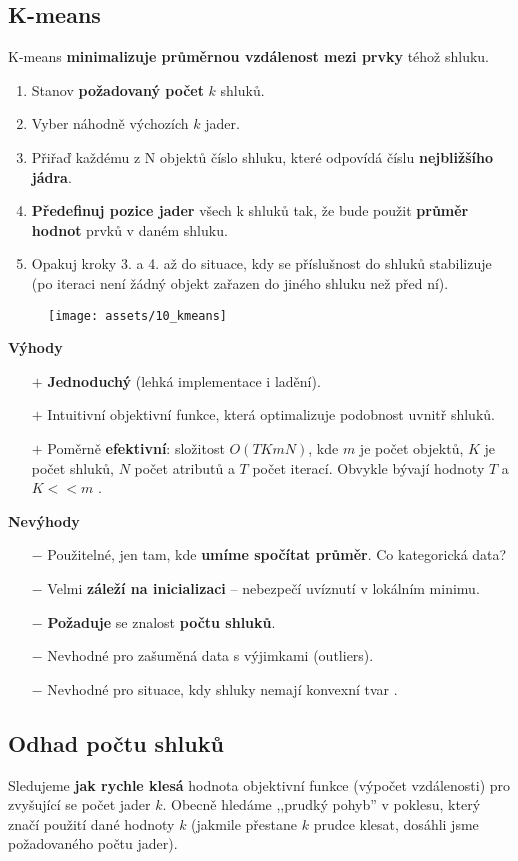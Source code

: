 \subsection{K-means}
K-means \textbf{minimalizuje průměrnou vzdálenost mezi prvky} téhož shluku.
\begin{enumerate}
    \item Stanov \textbf{požadovaný počet} $ k $ shluků.
    \item Vyber náhodně výchozích $ k $ jader.
    \item Přiřaď každému z N objektů číslo shluku, které odpovídá číslu \textbf{nejbližšího jádra}.
    \item \textbf{Předefinuj pozice jader} všech k shluků tak, že bude použit \textbf{průměr hodnot} prvků v daném shluku.
    \item Opakuj kroky 3. a 4. až do situace, kdy se příslušnost do shluků stabilizuje (po iteraci není žádný objekt zařazen do jiného shluku než před ní).
\end{enumerate}

\begin{figure}[H]
    \centering
    \texttt{[image: assets/10\_kmeans]}
\end{figure}

\noindent\textbf{Výhody}
\begin{itemize}
    \item[$+$] \textbf{Jednoduchý} (lehká implementace i ladění).
    \item[$+$] Intuitivní objektivní funkce, která optimalizuje podobnost uvnitř shluků.
    \item[$+$] Poměrně \textbf{efektivní}: složitost $ O(T  K  m N) $, kde $ m $ je počet objektů, $ K $ je počet shluků, $ N $ počet atributů a $ T $ počet iterací. Obvykle bývají hodnoty $ T$ a $ K << m $ .
\end{itemize}
\textbf{Nevýhody}
\begin{itemize}
    \item[$-$] Použitelné, jen tam, kde \textbf{umíme spočítat průměr}. Co kategorická data?
    \item[$-$] Velmi \textbf{záleží na inicializaci} – nebezpečí uvíznutí v lokálním minimu.
    \item[$-$] \textbf{Požaduje} se znalost \textbf{počtu shluků}.
    \item[$-$] Nevhodné pro zašuměná data s výjimkami (outliers).
    \item[$-$] Nevhodné pro situace, kdy shluky nemají konvexní tvar .
\end{itemize}

\subsection{Odhad počtu shluků}
Sledujeme \textbf{jak rychle klesá} hodnota objektivní funkce (výpočet vzdálenosti) pro zvyšující se počet jader $ k $. Obecně hledáme ,,prudký pohyb'' v poklesu, který značí použití dané hodnoty $k$ (jakmile přestane $k$ prudce klesat, dosáhli jsme požadovaného počtu jader).
